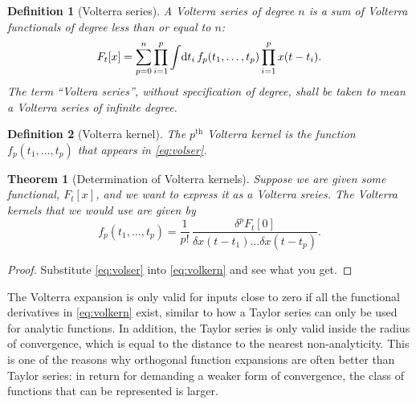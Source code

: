 \documentclass[12pt]{article}
\theoremstyle{slplain}
\newtheorem{thm}{Theorem}
\theoremstyle{sldefinition}
\newtheorem{defn}{Definition}
\theoremstyle{remark}
\begin{document}
\begin{defn}[Volterra series]
  A Volterra series of degree $n$ is a sum of Volterra functionals of degree less than or equal to $n$:
  \begin{equation}\label{eq:volser}
    F_t[x] = \sum_{p=0}^n\prod_{i=1}^p \int\!\mathrm{d} t_i\,  f_p(t_1,\ldots,t_p) \prod_{i=1}^p x(t-t_i).
  \end{equation}
  The term ``Voltera series'', without specification of degree, shall be taken to mean a Volterra series of infinite degree.
\end{defn}

\begin{defn}[Volterra kernel]
  The $p^{\text{th}}$ Volterra kernel is the function $f_p(t_1,\ldots,t_p)$ that appears in \eqref{eq:volser}.
\end{defn}

\begin{thm}[Determination of Volterra kernels]
  Suppose we are given some functional, $F_t[x]$, and we want to express it as a Volterra sreies. The Volterra kernels that we would use are given by
  \begin{equation}\label{eq:volkern}
    f_p(t_1,\ldots,t_p) = \frac{1}{p!}\, \frac{\delta^p F_t[0]}{\delta x(t-t_1) \ldots \delta x(t-t_p)}.
  \end{equation}
\end{thm}
\begin{proof}
  Substitute \eqref{eq:volser} into \eqref{eq:volkern} and see what you get.
\end{proof}

The Volterra expansion is only valid for inputs close to zero if all the functional derivatives in \eqref{eq:volkern} exist, similar to how a Taylor series can only be used for analytic functions. In addition, the Taylor series is only valid inside the radius of convergence, which is equal to the distance to the nearest non-analyticity. This is one of the reasons why orthogonal function expansions are often better than Taylor series: in return for demanding a weaker form of convergence, the class of functions that can be represented is larger.
\end{document}
